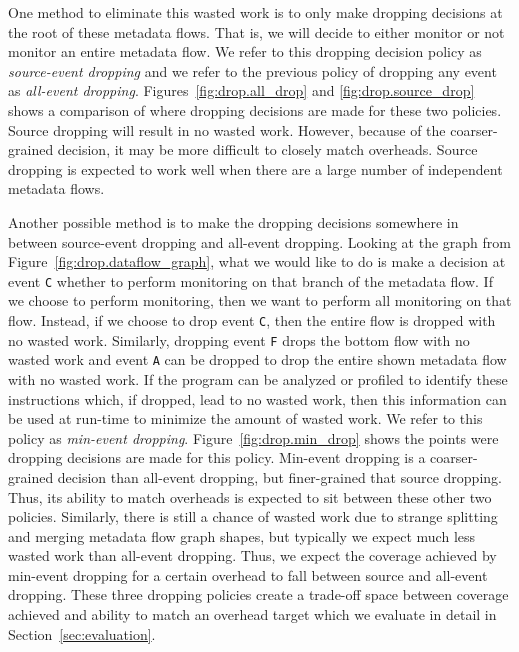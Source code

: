 One method to eliminate this wasted work is to only make dropping decisions at
the root of these metadata flows. That is, we will decide to either monitor or
not monitor an entire metadata flow. We refer to this dropping decision policy
as \emph{source-event dropping} and we refer to the previous policy of 
dropping any event as \emph{all-event dropping}.
Figures~\ref{fig:drop.all_drop} and \ref{fig:drop.source_drop} shows a
comparison of where dropping decisions are made for these two policies. Source
dropping will
result in no wasted work. However, because of the coarser-grained decision, it
may be more difficult to closely match overheads. Source dropping is expected
to work well when there are a large number of independent metadata flows.

Another possible method is to make the dropping decisions somewhere in between
source-event dropping and all-event dropping. Looking at the graph from 
Figure~\ref{fig:drop.dataflow_graph}, what we would like to do is make a
decision at event {\tt C} whether to perform monitoring on that branch of the
metadata flow. If we choose to perform monitoring, then we want to perform all
monitoring on that flow. Instead, if we choose to drop event {\tt C}, then the
entire flow is dropped with no wasted work. Similarly, dropping event {\tt F}
drops the bottom flow with no wasted work and event {\tt A} can be dropped to
drop the entire shown metadata flow with no wasted work. If the program can be
analyzed or profiled to identify these instructions which, if dropped, lead to
no wasted work, then this information can be used at run-time to minimize the
amount of wasted work. We refer to this policy as \emph{min-event dropping}.
Figure~\ref{fig:drop.min_drop} shows the points were dropping decisions are
made for this policy.
Min-event dropping is a coarser-grained decision than all-event dropping, but
finer-grained that source dropping. Thus, its ability to match overheads is
expected to sit between these other two policies. Similarly, there is still a
chance of wasted work due to strange splitting and merging metadata flow graph
shapes, but typically we expect much less wasted work than all-event 
dropping. Thus, we expect the coverage achieved by min-event dropping for a
certain overhead to fall between source and all-event dropping. These three
dropping policies create a trade-off space between coverage achieved and
ability to match an overhead target which we evaluate in detail in
Section~\ref{sec:evaluation}.

